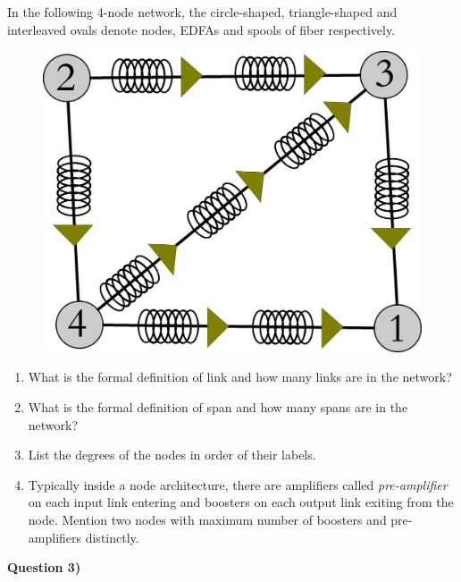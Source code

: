 \documentclass[10pt,letterpaper]{article}
\newcommand{\Q}[1]{\textbf{Question #1)}}
\begin{document}
In the following 4-node network, the circle-shaped, triangle-shaped and interleaved ovals denote nodes, EDFAs and spools of fiber respectively.
\begin{figure}[ht]
\centering
\includegraphics[scale=0.3]{PS1_Net}
\end{figure}
\begin{enumerate}[label=\alph*)]
\item
What is the formal definition of link and how many links are in the network?
\item
What is the formal definition of span and how many spans are in the network?
\item
List the degrees of the nodes in order of their labels.
\item
Typically inside a node architecture, there are amplifiers called \textit{pre-amplifier} on each input link entering and boosters on each output link exiting from the node. Mention two nodes with maximum number of boosters and pre-amplifiers distinctly.
\end{enumerate}

%
%

\Q3
\end{document}
